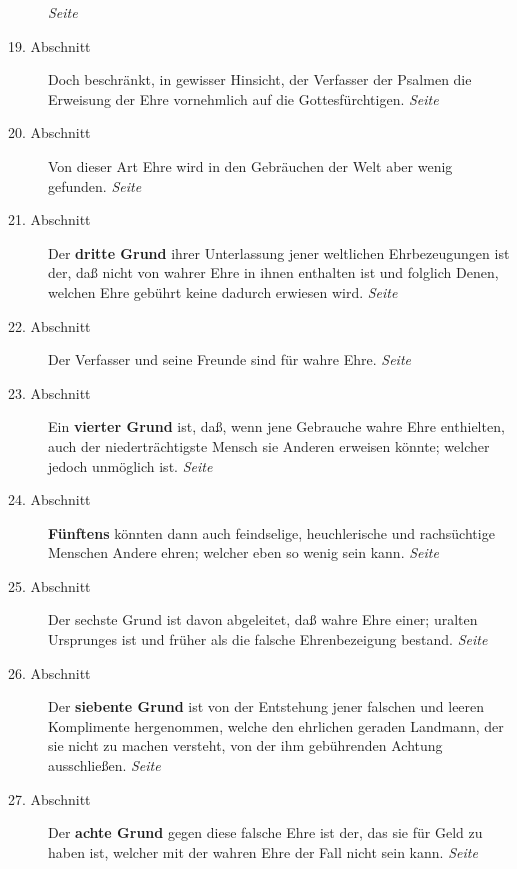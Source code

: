 \begin{description}
\dotfill \textit{Seite~\pageref{kap9_ab18}}\\
\item[19. Abschnitt] Doch beschränkt, in gewisser Hinsicht, der Verfasser der
Psalmen die Erweisung der Ehre vornehmlich auf die Gottesfürchtigen.
\dotfill \textit{Seite~\pageref{kap9_ab19}}\\
\item[20. Abschnitt] Von dieser Art Ehre wird in den Gebräuchen der Welt aber
wenig gefunden.
\dotfill \textit{Seite~\pageref{kap9_ab20}}\\
\item[21. Abschnitt] Der \textbf{dritte Grund} ihrer Unterlassung jener
weltlichen
Ehrbezeugungen ist der, daß nicht von wahrer Ehre in ihnen enthalten ist und
folglich Denen, welchen Ehre gebührt keine dadurch erwiesen wird.
\dotfill \textit{Seite~\pageref{kap9_ab21}}\\
\item[22. Abschnitt] Der Verfasser und seine Freunde sind für wahre Ehre.
\dotfill \textit{Seite~\pageref{kap9_ab22}}\\
\item[23. Abschnitt] Ein \textbf{vierter Grund} ist, daß, wenn jene Gebrauche
wahre Ehre
enthielten, auch der niederträchtigste Mensch sie Anderen erweisen könnte;
welcher jedoch unmöglich ist.
\dotfill \textit{Seite~\pageref{kap9_ab23}}\\
\item[24. Abschnitt] \textbf{Fünftens} könnten dann auch feindselige,
heuchlerische und
rachsüchtige Menschen Andere ehren; welcher eben so wenig sein kann.
\dotfill \textit{Seite~\pageref{kap9_ab24}}\\
\item[25. Abschnitt] Der sechste Grund ist davon abgeleitet, daß wahre Ehre
einer; uralten Ursprunges ist und früher als die falsche Ehrenbezeigung bestand.
\dotfill \textit{Seite~\pageref{kap9_ab25}}\\
\item[26. Abschnitt] Der \textbf{siebente Grund} ist von der Entstehung jener
falschen
und leeren Komplimente hergenommen, welche den ehrlichen geraden Landmann, der
sie nicht zu machen versteht, von der ihm gebührenden Achtung ausschließen.
\dotfill \textit{Seite~\pageref{kap9_ab26}}\\
\item[27. Abschnitt] Der \textbf{achte Grund} gegen diese falsche Ehre ist der,
das sie
für Geld zu haben ist, welcher mit der wahren Ehre der Fall nicht sein kann.
\dotfill \textit{Seite~\pageref{kap9_ab27}}\\

\end{description}
